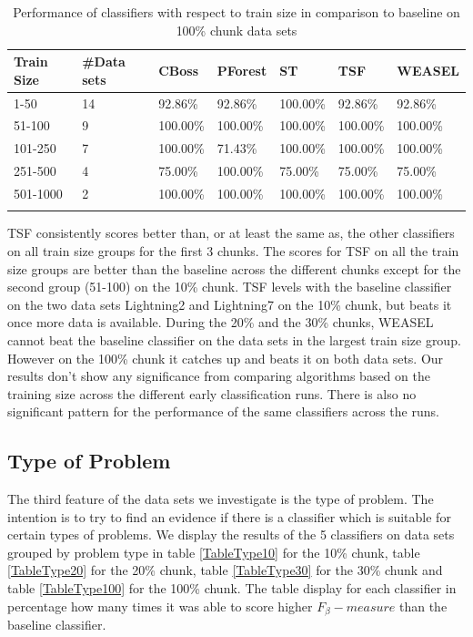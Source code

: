\begin{table}[hbt!]
	\setlength\extrarowheight{2pt} %
	\begin{tabularx}{\textwidth}{|X|X|X|X|X|X|X|}
	\hline
	\textbf{Train Size} & \textbf{\#Data sets} & \textbf{CBoss} & \textbf{PForest} & \textbf{ST} & \textbf{TSF} & \textbf{WEASEL} \\ \hline
		1-50 & 14 & 92.86\% & 92.86\% & 100.00\% & 92.86\% & 92.86\% \\ \hline
		51-100 & 9 & 100.00\% & 100.00\% & 100.00\% & 100.00\% & 100.00\% \\ \hline
		101-250 & 7 & 100.00\% & 71.43\% & 100.00\% & 100.00\% & 100.00\% \\ \hline
		251-500 & 4 & 75.00\% & 100.00\% & 75.00\% & 75.00\% & 75.00\% \\ \hline
		501-1000 & 2 &100.00\% & 100.00\% & 100.00\% & 100.00\% & 100.00\% \\ \hline
  \caption{Performance of classifiers with respect to train size in comparison to baseline on 100\% chunk data sets}
  \label{TableSize100}
  \end{tabularx}
\end{table}

TSF consistently scores better than, or at least the same as, the other classifiers on all train size groups for the first 3 chunks.
The scores for TSF on all the train size groups are better than the baseline across the different chunks except for the second group (51-100) on the 10\% chunk.
TSF levels with the baseline classifier on the two data sets Lightning2 and Lightning7 on the 10\% chunk, but beats it once more data is available.
During the 20\% and the 30\% chunks, WEASEL cannot beat the baseline classifier on the data sets in the largest train size group.
However on the 100\% chunk it catches up and beats it on both data sets.
Our results don't show any significance from comparing algorithms based on the training size across the different early classification runs.
There is also no significant pattern for the performance of the same classifiers across the runs.


\subsection{Type of Problem}
The third feature of the data sets we investigate is the type of problem.
The intention is to try to find an evidence if there is a classifier which is suitable for certain types of problems.
We display the results of the 5 classifiers on data sets grouped by problem type in table \ref{TableType10} for the 10\% chunk, table \ref{TableType20} for the 20\% chunk, table \ref{TableType30} for the 30\% chunk and table \ref{TableType100} for the 100\% chunk.
The table display for each classifier in percentage how many times it was able to score higher $F_{\beta}-measure$ than the baseline classifier.

